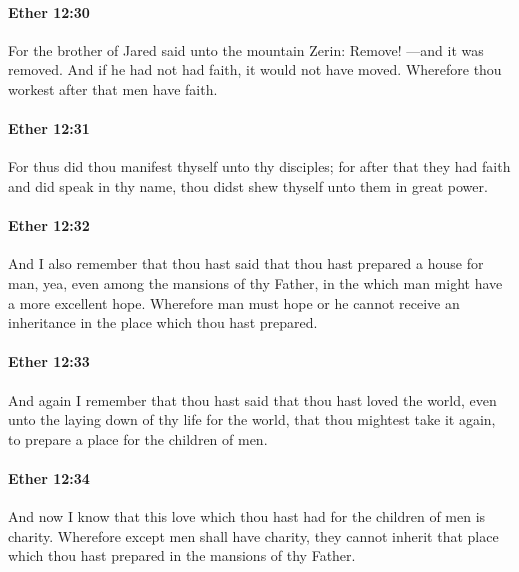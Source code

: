 		\paragraph{Ether 12:30} %
			\label{ETHER-12-30}

			For the brother of Jared said unto the mountain Zerin: Remove!
			---and it was removed.
			And if he had not had faith,
			it would not have moved.
			Wherefore thou workest after that men have faith.

		\paragraph{Ether 12:31} %
			\label{ETHER-12-31}

			For thus did thou manifest thyself unto thy disciples;
			for after that they had faith and did speak in thy name,
			thou didst shew thyself unto them in great power.

		\paragraph{Ether 12:32} %
			\label{ETHER-12-32}

			And I also remember that thou hast said
			that thou hast prepared a house for man,
			yea, even among the mansions of thy Father,
			in the which man might have a more excellent hope.
			Wherefore man must hope or he cannot receive an inheritance
			in the place which thou hast prepared.

		\paragraph{Ether 12:33} %
			\label{ETHER-12-33}

			And again I remember that thou hast said
			that thou hast loved the world,
			even unto the laying down of thy life for the world,
			that thou mightest take it again,
			to prepare a place for the children of men.

		\paragraph{Ether 12:34} %
			\label{ETHER-12-34}

			And now I know
			that this love which thou hast had for the children of men is charity.
			Wherefore except men shall have charity,
			they cannot inherit that place
			which thou hast prepared in the mansions of thy Father.

